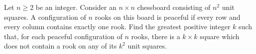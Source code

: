 Let 
$n \ge 2$
 be an integer. Consider an 
$n \times n$
 chessboard consisting of 
$n^2$
 unit squares. A configuration of 
$n$
 rooks on this board is 
peaceful
 if every row and every column contains exactly one rook. Find the greatest positive integer 
$k$
 such that, for each peaceful configuration of 
$n$
 rooks, there is a 
$k \times k$
 square which does not contain a rook on any of its 
$k^2$
 unit squares.
